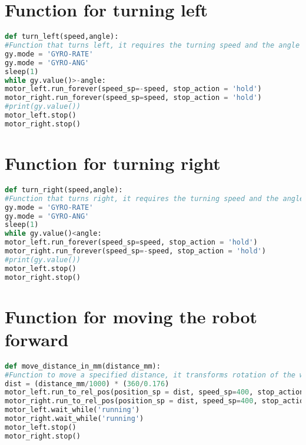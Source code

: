 \section{Function for turning left}
\vspace{-7mm}
\begin{lstlisting}[language={python}, caption={Function for turning left}, label=leftTurn]
def turn_left(speed,angle):
#Function that turns left, it requires the turning speed and the angle it must turn
gy.mode = 'GYRO-RATE'
gy.mode = 'GYRO-ANG'
sleep(1)
while gy.value()>-angle:
motor_left.run_forever(speed_sp=-speed, stop_action = 'hold')
motor_right.run_forever(speed_sp=speed, stop_action = 'hold')
#print(gy.value())
motor_left.stop()
motor_right.stop()
\end{lstlisting}

\section{Function for turning right}
\vspace{-7mm}
\begin{lstlisting}[language={python}, caption={Function for turning right}, label=rightTurn]
def turn_right(speed,angle):
#Function that turns right, it requires the turning speed and the angle it must turn
gy.mode = 'GYRO-RATE'
gy.mode = 'GYRO-ANG'
sleep(1)
while gy.value()<angle:
motor_left.run_forever(speed_sp=speed, stop_action = 'hold')
motor_right.run_forever(speed_sp=-speed, stop_action = 'hold')
#print(gy.value())
motor_left.stop()
motor_right.stop()
\end{lstlisting}

\section{Function for moving the robot forward}
\vspace{-7mm}
\begin{lstlisting}[language={python}, caption={Function for moving the robot forward}, label=moveDistance]
def move_distance_in_mm(distance_mm):
#Function to move a specified distance, it transforms rotation of the wheels to distance.
dist = (distance_mm/1000) * (360/0.176)
motor_left.run_to_rel_pos(position_sp = dist, speed_sp=400, stop_action = "brake")
motor_right.run_to_rel_pos(position_sp = dist, speed_sp=400, stop_action = "brake")
motor_left.wait_while('running')
motor_right.wait_while('running')
motor_left.stop()
motor_right.stop()
\end{lstlisting}
\newpage

